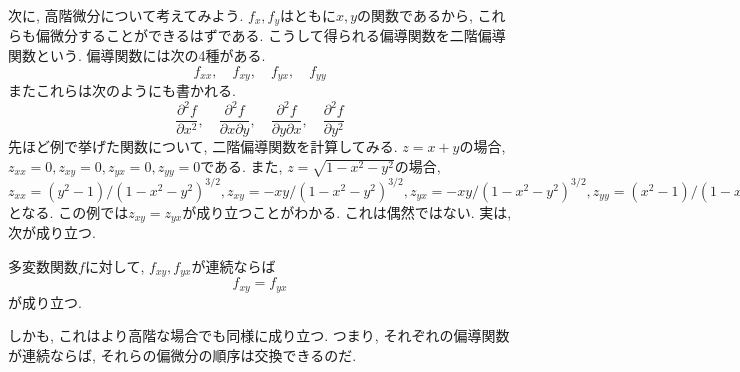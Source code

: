 \documentclass[a4j,dvipdfmx]{jsarticle}
\numberwithin{equation}{section}
\begin{document}
            次に, 高階微分について考えてみよう. $f_x,f_y$はともに$x,y$の関数であるから, これらも偏微分することができるはずである. こうして得られる偏導関数を二階偏導関数という.
            偏導関数には次の4種がある.
            \begin{equation*}
                f_{xx},\quad f_{xy},\quad f_{yx},\quad f_{yy} 
            \end{equation*}
            またこれらは次のようにも書かれる.
            \begin{equation*}
                \frac{\partial^2 f}{\partial x^2},\quad \frac{\partial^2 f}{\partial x\partial y},\quad \frac{\partial^2 f}{\partial y\partial x},\quad \frac{\partial^2 f}{\partial y^2}
            \end{equation*}
            先ほど例で挙げた関数について, 二階偏導関数を計算してみる. $z=x+y$の場合, $z_{xx}=0,z_{xy}=0,z_{yx}=0,z_{yy}=0$である. また, $z=\sqrt{1-x^2-y^2}$の場合, $z_{xx}=(y^2-1)/(1-x^2-y^2)^{3/2},z_{xy}=-xy/(1-x^2-y^2)^{3/2},z_{yx}=-xy/(1-x^2-y^2)^{3/2},z_{yy}=(x^2-1)/(1-x^2-y^2)^{3/2}$となる.
            この例では$z_{xy}=z_{yx}$が成り立つことがわかる. これは偶然ではない. 実は, 次が成り立つ.
            \begin{screen}
                多変数関数$f$に対して, $f_{xy},f_{yx}$が連続ならば
                \begin{equation}
                    f_{xy}=f_{yx} \label{eq:偏微分:偏微分の交換}
                \end{equation}
                が成り立つ.
            \end{screen}
            しかも, これはより高階な場合でも同様に成り立つ. つまり, それぞれの偏導関数が連続ならば, それらの偏微分の順序は交換できるのだ.
\end{document}
